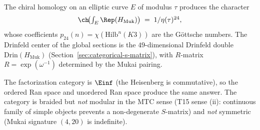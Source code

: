 The chiral homology on an elliptic curve $E$ of modulus $\tau$ produces the character
\[
 \ch\!\bigl(\textstyle\int_E \Rep(H_{\mathrm{Muk}})\bigr)
 \;=\; 1/\eta(\tau)^{24},
\]
whose coefficients $p_{24}(n) = \chi(\mathrm{Hilb}^n(K3))$ are the G\"ottsche numbers. The Drinfeld center of the global sections is the $49$-dimensional Drinfeld double $\mathrm{Drin}(H_{\mathrm{Muk}})$ (Section~\ref{sec:categorical-s-matrix}), with $R$-matrix $R = \exp(\omega^{-1})$ determined by the Mukai pairing.

The factorization category is $\Einf$ (the Heisenberg is commutative), so the ordered Ran space and unordered Ran space produce the same answer. The category is braided but \emph{not} modular in the MTC sense (T15 sense (ii): continuous family of simple objects prevents a non-degenerate $S$-matrix) and \emph{not} symmetric (Mukai signature $(4,20)$ is indefinite).

